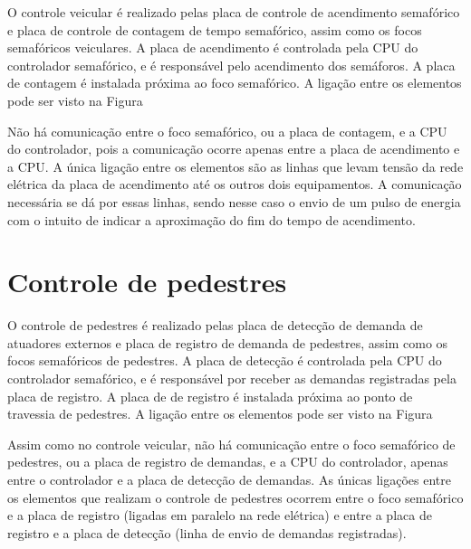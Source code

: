 O controle veicular é realizado pelas placa de controle de acendimento semafórico e placa de controle de contagem de tempo semafórico, assim como os focos semafóricos veiculares. A placa de acendimento é controlada pela \ac{CPU} do controlador semafórico, e é responsável pelo acendimento dos semáforos. A placa de contagem é instalada próxima ao foco semafórico. A ligação entre os elementos pode ser visto na Figura

Não há comunicação entre o foco semafórico, ou a placa de contagem, e a \ac{CPU} do controlador, pois a comunicação ocorre apenas entre a placa de acendimento e a \ac{CPU}. A única ligação entre os elementos são as linhas que levam tensão da rede elétrica da placa de acendimento até os outros dois equipamentos. A comunicação necessária se dá por essas linhas, sendo nesse caso o envio de um pulso de energia com o intuito de indicar a aproximação do fim do tempo de acendimento.

\section{Controle de pedestres}

O controle de pedestres é realizado pelas placa de detecção de demanda de atuadores externos e placa de registro de demanda de pedestres, assim como os focos semafóricos de pedestres. A placa de detecção é controlada pela \ac{CPU} do controlador semafórico, e é responsável por receber as demandas registradas pela placa de registro. A placa de de registro é instalada próxima ao ponto de travessia de pedestres. A ligação entre os elementos pode ser visto na Figura

Assim como no controle veicular, não há comunicação entre o foco semafórico de pedestres, ou a placa de registro de demandas, e a \ac{CPU} do controlador, apenas entre o controlador e a placa de detecção de demandas. As únicas ligações entre os elementos que realizam o controle de pedestres ocorrem entre o foco semafórico e a placa de registro (ligadas em paralelo na rede elétrica) e entre a placa de registro e a placa de detecção (linha de envio de demandas registradas). 